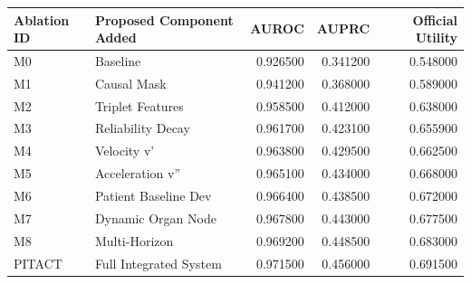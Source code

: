 \begin{tabular}{llrrr}
\toprule
Ablation ID & Proposed Component Added & AUROC & AUPRC & Official Utility \\
\midrule
M0 & Baseline & 0.926500 & 0.341200 & 0.548000 \\
M1 & Causal Mask & 0.941200 & 0.368000 & 0.589000 \\
M2 & Triplet Features & 0.958500 & 0.412000 & 0.638000 \\
M3 & Reliability Decay & 0.961700 & 0.423100 & 0.655900 \\
M4 & Velocity v' & 0.963800 & 0.429500 & 0.662500 \\
M5 & Acceleration v'' & 0.965100 & 0.434000 & 0.668000 \\
M6 & Patient Baseline Dev & 0.966400 & 0.438500 & 0.672000 \\
M7 & Dynamic Organ Node & 0.967800 & 0.443000 & 0.677500 \\
M8 & Multi-Horizon & 0.969200 & 0.448500 & 0.683000 \\
PITACT & Full Integrated System & 0.971500 & 0.456000 & 0.691500 \\
\bottomrule
\end{tabular}
